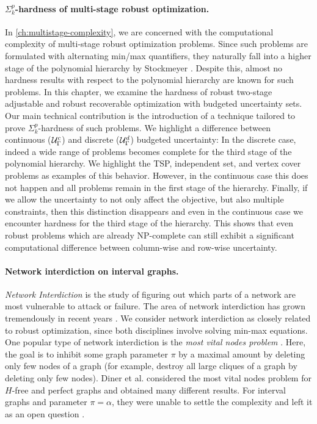 \paragraph*{$\Sigma^p_k$-hardness of multi-stage robust optimization.}
In \cref{ch:multistage-complexity}, we are concerned with the computational complexity of multi-stage robust optimization problems. Since such problems are formulated with alternating min/max quantifiers, they naturally fall into a higher stage of the polynomial hierarchy by Stockmeyer \cite{stockmeyer1976polynomial}. Despite this, almost no hardness results with respect to the polynomial hierarchy are known for such problems. In this chapter, we examine the hardness of robust two-stage adjustable and robust recoverable optimization with budgeted uncertainty sets. Our main technical contribution is the introduction of a technique tailored to prove $\Sigma^p_k$-hardness of such problems. We highlight a difference between continuous ($\mathcal{U}^c_\Gamma$) and discrete ($\mathcal{U}^d_\Gamma$) budgeted uncertainty: In the discrete case, indeed a wide range of problems becomes complete for the third stage of the polynomial hierarchy. We highlight the TSP, independent set, and vertex cover problems as examples of this behavior. However, in the continuous case this does not happen and all problems remain in the first stage of the hierarchy. Finally, if we allow the uncertainty to not only affect the objective, but also multiple constraints, then this distinction disappears and even in the continuous case we encounter hardness for the third stage of the hierarchy. This shows that even robust problems which are already NP-complete can still exhibit a significant computational difference between column-wise and row-wise uncertainty.

\paragraph*{Network interdiction on interval graphs.}
\emph{Network Interdiction} \cite{NetworkInterdictProblemsBookChapter} is the study of figuring out which parts of a network are most vulnerable to attack or failure. The area of network interdiction has grown tremendously in recent years \cite{criticalNodeDetectionSurvey}. 
We consider network interdiction as closely related to robust optimization, since both disciplines involve solving min-max equations. One popular type of network interdiction is the \emph{most vital nodes problem}  \cite{baier2010length,complexityOfFindingMostVitalNodesShortestPath,mostVitalNodesWrtIndSet,mostVitalLinksNodes1982,mahdavi2014minimum}. Here, the goal is to inhibit some graph parameter $\pi$ by a maximal amount by deleting only few nodes of a graph (for example, destroy all large cliques of a graph by deleting only few nodes). Diner et al. \cite{diner2018contractionDeletionBlockers} considered the most vital nodes problem for $H$-free and perfect graphs and obtained many different results. For interval graphs and parameter $\pi = \alpha$, they were unable to settle the complexity and left it as an open question \cite[(Q2)]{diner2018contractionDeletionBlockers}.

